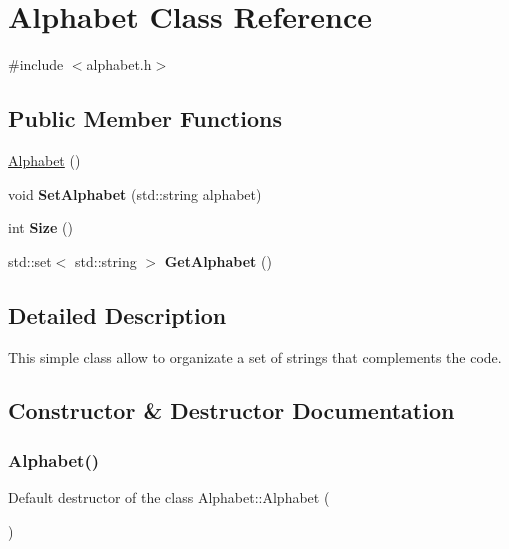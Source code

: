 \hypertarget{classAlphabet}{}\section{Alphabet Class Reference}
\label{classAlphabet}


{\ttfamily \#include $<$alphabet.\+h$>$}

\subsection*{Public Member Functions}
\begin{DoxyCompactItemize}
\item 
\hyperlink{classAlphabet_abceac78a6d898def9c290013b99b136d}{Alphabet} ()
\item 
\mbox{\label{classAlphabet_a2a61d36e511d77704215dce942847ed9}} 
void {\bfseries Set\+Alphabet} (std\+::string alphabet)
\item 
\mbox{\label{classAlphabet_a154f45f063a75a8116e8f9022440287e}} 
int {\bfseries Size} ()
\item 
\mbox{\label{classAlphabet_aa27c86b98daa058dc4f299b13c76ee8b}} 
std\+::set$<$ std\+::string $>$ {\bfseries Get\+Alphabet} ()
\end{DoxyCompactItemize}


\subsection{Detailed Description}
This simple class allow to organizate a set of strings that complements the code. 

\subsection{Constructor \& Destructor Documentation}
\mbox{\label{classAlphabet_abceac78a6d898def9c290013b99b136d}} 
\subsubsection{\texorpdfstring{Alphabet()}{Alphabet()}}
{\footnotesize\ttfamily Default destructor of the class Alphabet\+::\+Alphabet (\begin{DoxyParamCaption}{ }\end{DoxyParamCaption})}

